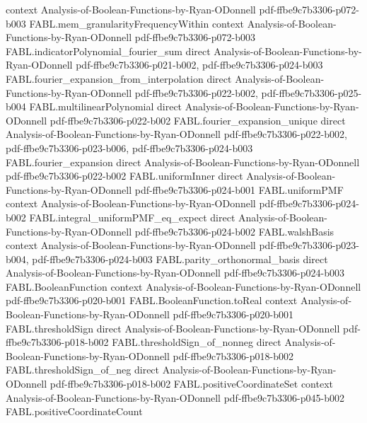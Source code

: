 \begin{theorem}
  {context}
  {Analysis-of-Boolean-Functions-by-Ryan-ODonnell}
  {pdf-ffbe9c7b3306-p072-b003}
\proofstep
  {FABL.mem_granularityFrequencyWithin}
  {context}
  {Analysis-of-Boolean-Functions-by-Ryan-ODonnell}
  {pdf-ffbe9c7b3306-p072-b003}
\proofstep
  {FABL.indicatorPolynomial_fourier_sum}
  {direct}
  {Analysis-of-Boolean-Functions-by-Ryan-ODonnell}
  {pdf-ffbe9c7b3306-p021-b002,
    pdf-ffbe9c7b3306-p024-b003}
\proofstep
  {FABL.fourier_expansion_from_interpolation}
  {direct}
  {Analysis-of-Boolean-Functions-by-Ryan-ODonnell}
  {pdf-ffbe9c7b3306-p022-b002,
    pdf-ffbe9c7b3306-p025-b004}
\proofstep
  {FABL.multilinearPolynomial}
  {direct}
  {Analysis-of-Boolean-Functions-by-Ryan-ODonnell}
  {pdf-ffbe9c7b3306-p022-b002}
\proofstep
  {FABL.fourier_expansion_unique}
  {direct}
  {Analysis-of-Boolean-Functions-by-Ryan-ODonnell}
  {pdf-ffbe9c7b3306-p022-b002,
    pdf-ffbe9c7b3306-p023-b006,
    pdf-ffbe9c7b3306-p024-b003}
\proofstep
  {FABL.fourier_expansion}
  {direct}
  {Analysis-of-Boolean-Functions-by-Ryan-ODonnell}
  {pdf-ffbe9c7b3306-p022-b002}
\proofstep
  {FABL.uniformInner}
  {direct}
  {Analysis-of-Boolean-Functions-by-Ryan-ODonnell}
  {pdf-ffbe9c7b3306-p024-b001}
\proofstep
  {FABL.uniformPMF}
  {context}
  {Analysis-of-Boolean-Functions-by-Ryan-ODonnell}
  {pdf-ffbe9c7b3306-p024-b002}
\proofstep
  {FABL.integral_uniformPMF_eq_expect}
  {direct}
  {Analysis-of-Boolean-Functions-by-Ryan-ODonnell}
  {pdf-ffbe9c7b3306-p024-b002}
\proofstep
  {FABL.walshBasis}
  {context}
  {Analysis-of-Boolean-Functions-by-Ryan-ODonnell}
  {pdf-ffbe9c7b3306-p023-b004,
    pdf-ffbe9c7b3306-p024-b003}
\proofstep
  {FABL.parity_orthonormal_basis}
  {direct}
  {Analysis-of-Boolean-Functions-by-Ryan-ODonnell}
  {pdf-ffbe9c7b3306-p024-b003}
\proofstep
  {FABL.BooleanFunction}
  {context}
  {Analysis-of-Boolean-Functions-by-Ryan-ODonnell}
  {pdf-ffbe9c7b3306-p020-b001}
\proofstep
  {FABL.BooleanFunction.toReal}
  {context}
  {Analysis-of-Boolean-Functions-by-Ryan-ODonnell}
  {pdf-ffbe9c7b3306-p020-b001}
\proofstep
  {FABL.thresholdSign}
  {direct}
  {Analysis-of-Boolean-Functions-by-Ryan-ODonnell}
  {pdf-ffbe9c7b3306-p018-b002}
\proofstep
  {FABL.thresholdSign_of_nonneg}
  {direct}
  {Analysis-of-Boolean-Functions-by-Ryan-ODonnell}
  {pdf-ffbe9c7b3306-p018-b002}
\proofstep
  {FABL.thresholdSign_of_neg}
  {direct}
  {Analysis-of-Boolean-Functions-by-Ryan-ODonnell}
  {pdf-ffbe9c7b3306-p018-b002}
\proofstep
  {FABL.positiveCoordinateSet}
  {context}
  {Analysis-of-Boolean-Functions-by-Ryan-ODonnell}
  {pdf-ffbe9c7b3306-p045-b002}
\proofstep
  {FABL.positiveCoordinateCount}

\end{theorem}
